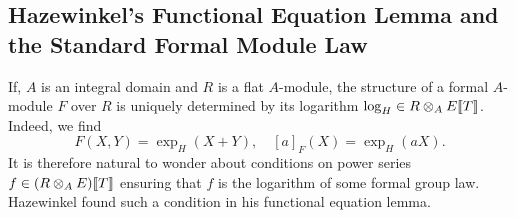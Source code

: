 \documentclass[../main.tex]{subfiles}
\begin{document}

\subsection{Hazewinkel's Functional Equation Lemma and the Standard Formal Module Law} %
\label{sub:Hazewinkels FuncEq and the Standard Formal Module}
If, $A$ is an integral domain and $R$ is a flat $A$-module, the structure of a formal
$A$-module $F$ over $R$ is uniquely determined by its logarithm $\log_H
\in R \otimes_A E \llbracket T \rrbracket$. Indeed, we find
\begin{equation*}
  F(X,Y) = \exp_H(X+Y), \quad [a]_F(X) = \exp_H(a X).
\end{equation*}
It is therefore natural to wonder about conditions on power series $f \in
(R\otimes_A E) \llbracket T \rrbracket$ ensuring that $f$ is the logarithm of some
formal group law. Hazewinkel found such a condition in his functional equation
lemma.
\end{document}

